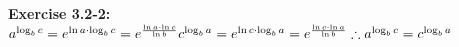 \documentclass{article}
\begin{document}
\begin{spacing}{2.0}
\noindent
\textbf{Exercise 3.2-2:}\\
$
a^{\log_bc} = e^{\ln a \cdot \log_bc} = e^{\frac{\ln a \cdot \ln c}{\ln b}}\\
c^{\log_ba} = e^{\ln c \cdot \log_ba} = e^{\frac{\ln c \cdot \ln a}{\ln b}}\\
\therefore a^{\log_bc} = c^{\log_ba}\\
$
\end{spacing}
\end{document}
